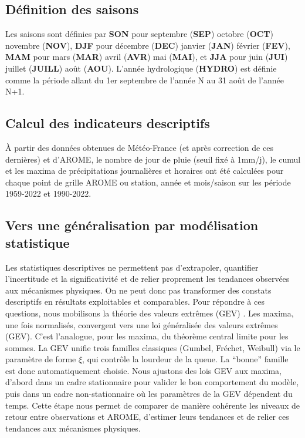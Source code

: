 \documentclass[
  article,
  nofooter,
  noheadings]{jss}
\begin{document}
\subsection{Définition des saisons}\label{duxe9finition-des-saisons}

Les saisons sont définies par \textbf{SON} pour septembre (\textbf{SEP})
octobre (\textbf{OCT}) novembre (\textbf{NOV}), \textbf{DJF} pour
décembre (\textbf{DEC}) janvier (\textbf{JAN}) février (\textbf{FEV}),
\textbf{MAM} pour mars (\textbf{MAR}) avril (\textbf{AVR}) mai
(\textbf{MAI}), et \textbf{JJA} pour juin (\textbf{JUI}) juillet
(\textbf{JUILL}) août (\textbf{AOU}). L'année hydrologique
(\textbf{HYDRO}) est définie comme la période allant du 1er septembre de
l'année N au 31 août de l'année N+1.

\subsection{Calcul des indicateurs
descriptifs}\label{calcul-des-indicateurs-descriptifs}

À partir des données obtenues de Météo-France (et après correction de
ces dernières) et d'AROME, le nombre de jour de pluie (seuil fixé à
1mm/j), le cumul et les maxima de précipitations journalières et
horaires ont été calculées pour chaque point de grille AROME ou station,
année et mois/saison sur les période 1959-2022 et 1990-2022.

\subsection{Vers une généralisation par modélisation
statistique}\label{vers-une-guxe9nuxe9ralisation-par-moduxe9lisation-statistique}

Les statistiques descriptives ne permettent pas d'extrapoler, quantifier
l'incertitude et la significativité et de relier proprement les
tendances observées aux mécanismes physiques. On ne peut donc pas
transformer des constats descriptifs en résultats exploitables et
comparables. Pour répondre à ces questions, nous mobilisons la théorie
des valeurs extrêmes (GEV) \citep{coles2001introduction}. Les maxima,
une fois normalisés, convergent vers une loi généralisée des valeurs
extrêmes (GEV). C'est l'analogue, pour les maxima, du théorème central
limite pour les sommes. La GEV unifie trois familles classiques (Gumbel,
Fréchet, Weibull) via le paramètre de forme \(\xi\), qui contrôle la
lourdeur de la queue. La ``bonne'' famille est donc automatiquement
choisie. Nous ajustons des lois GEV aux maxima, d'abord dans un cadre
stationnaire pour valider le bon comportement du modèle, puis dans un
cadre non‑stationnaire où les paramètres de la GEV dépendent du temps.
Cette étape nous permet de comparer de manière cohérente les niveaux de
retour entre observations et AROME, d'estimer leurs tendances et de
relier ces tendances aux mécanismes physiques.
\end{document}
